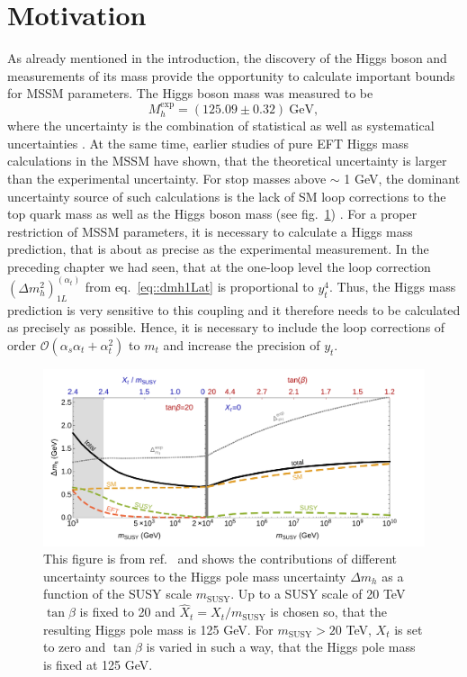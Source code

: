 \documentclass[a4paper,12pt]{book}
\begin{document}
\section{Motivation}
As already mentioned in the introduction, the discovery of the Higgs boson and measurements of its mass provide the opportunity to calculate important bounds for MSSM parameters. The Higgs boson mass was measured to be 
\begin{equation}
M_h^\text{exp} = \left(125.09 \pm 0.32\right) \> \text{GeV},
\end{equation} 
where the uncertainty is the combination of statistical as well as systematical uncertainties \cite{higgsmeasurement1,higgsmeasurement2}. At the same time, earlier studies of pure EFT Higgs mass calculations in the MSSM have shown, that the theoretical uncertainty is larger than the experimental uncertainty. For stop masses above $\sim$ 1 GeV, the dominant uncertainty source of such calculations is the lack of SM loop corrections to the top quark mass as well as the Higgs boson mass (see fig.\ \ref{fig::susyhduncertainties}) \cite{susyhd,uncertainty,allanachvoigt}.  For a proper restriction of MSSM parameters, it is necessary to calculate a Higgs mass prediction, that is about as precise as the experimental measurement. In the preceding chapter we had seen, that at the one-loop level the loop correction $(\Delta m_h^2)^{(\alpha_t)}_{1L}$ from eq.\ \eqref{eq::dmh1Lat} is proportional to $y_t^4$. Thus, the Higgs mass prediction is very sensitive to this coupling and it therefore needs to be calculated as precisely as possible. Hence, it is necessary to include the loop corrections of order $\mathcal{O}(\alpha_s\alpha_t+\alpha_t^2)$ to $m_t$ and increase the precision of $y_t$.\par
\begin{figure}[h]
\begin{center}
\includegraphics[width=\textwidth]{src/img/susyhd.pdf}
\caption{This figure is from ref.\ \cite{susyhd} and shows the contributions of different uncertainty sources to the Higgs pole mass uncertainty $\Delta m_h$ as a function of the SUSY scale $m_\text{SUSY}$. Up to a SUSY scale of 20 TeV $\tan\beta$ is fixed to 20 and $\hat{X}_t=X_t/m_\text{SUSY}$ is chosen so, that the resulting Higgs pole mass is 125 GeV. For $m_\text{SUSY} > 20$ TeV, $X_t$ is set to zero and $\tan\beta$ is varied in such a way, that the Higgs pole mass is fixed at 125 GeV.}
\label{fig::susyhduncertainties}
\end{center}
\end{figure}
\end{document}
